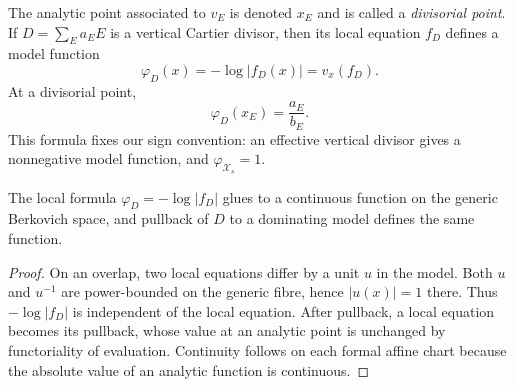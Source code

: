 The analytic point associated to $v_E$ is denoted $x_E$ and is called a
\emph{divisorial point}. If $D=\sum_E a_EE$ is a vertical Cartier divisor,
then its local equation $f_D$ defines a model function
\[
                         \varphi_D(x)=-\log|f_D(x)|=v_x(f_D).
\]
At a divisorial point,
\[
                         \varphi_D(x_E)=\frac{a_E}{b_E}.
\]
This formula fixes our sign convention: an effective vertical divisor gives
a nonnegative model function, and $\varphi_{\mathcal X_s}=1$.

\begin{lemma}
\label{lem:model-function-well-defined}
The local formula $\varphi_D=-\log|f_D|$ glues to a continuous function on the
generic Berkovich space, and pullback of $D$ to a dominating model defines the
same function.
\end{lemma}
\begin{proof}
On an overlap, two local equations differ by a unit $u$ in the model.
Both $u$ and $u^{-1}$ are power-bounded on the generic fibre, hence
$|u(x)|=1$ there. Thus $-\log|f_D|$ is independent of the local equation.
After pullback, a local equation becomes its pullback, whose value at an
analytic point is unchanged by functoriality of evaluation. Continuity follows
on each formal affine chart because the absolute value of an analytic
function is continuous.
\end{proof}

